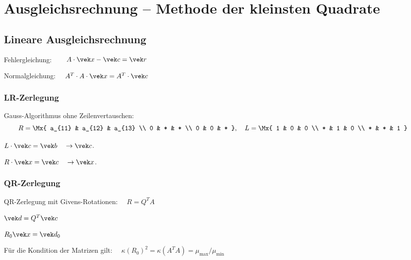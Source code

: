 \section{Ausgleichsrechnung -- Methode der kleinsten Quadrate}
	\subsection{Lineare Ausgleichsrechnung}
		Fehlergleichung: $\quad\ \:\: A\cdot \vek x - \vek c = \vek r$

		Normalgleichung: $\quad A^T \cdot A \cdot \vek x = A^T \cdot \vek c$

		\subsubsection{LR-Zerlegung}
			\begin{algo}
				\begin{tightenumerate}
					\item Gauss-Algorithmus ohne Zeilenvertauschen:
						\[
							R = \Mx{
								a_{11} & a_{12} & a_{13} \\
								0 & * & * \\
								0 & 0 & *
							}, \quad L = \Mx{
								1 & 0 & 0 \\
								* & 1 & 0 \\
								* & * & 1
							}
						\]
					\item $L\cdot \vek c = \vek b \quad \rightarrow \vek c$.
					\item $R \cdot \vek x = \vek c \quad \rightarrow \vek x$.
				\end{tightenumerate}
			\end{algo}

		\subsubsection{QR-Zerlegung}
			\begin{algo}
				\begin{tightenumerate}
					\item QR-Zerlegung mit Givens-Rotationen: $\quad R = Q^T A$
					\item $\vek d = Q^T \vek c$
					\item $R_0 \vek x = \vek d_0$
				\end{tightenumerate}
				Für die Kondition der Matrizen gilt: $\quad \kappa(R_0)^2 = \kappa(A^T A) = \mu_\text{max}/\mu_\text{min}$
			\end{algo}

